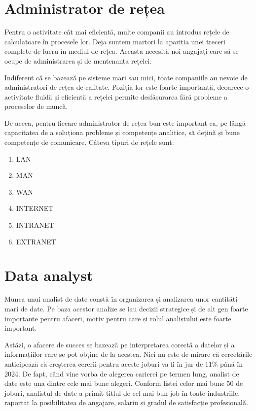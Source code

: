 \documentclass{article}
\begin{document}
\section{Administrator de rețea}
\hspace{0.5 cm}Pentru o activitate cât mai eficientă, multe companii au introdus rețele de calculatoare în procesele lor. Deja suntem martori la apariția unei treceri complete de lucru în mediul de rețea. Aceasta necesită noi angajați care să se ocupe de administrarea și de mentenanța rețelei.\par
Indiferent că se bazează pe sisteme mari sau mici, toate companiile au nevoie de  administratori de rețea de calitate. Poziția lor este foarte importantă, deoarece o activitate fluidă și eficientă a rețelei permite desfășurarea fără probleme a proceselor de muncă.\par
De aceea, pentru fiecare administrator de rețea bun este important ca, pe lângă capacitatea de a soluționa probleme și competențe analitice, să dețină și bune competențe de comunicare. Câteva tipuri de rețele sunt:
\begin{enumerate}
\item LAN
\item MAN
\item WAN
\item INTERNET
\item INTRANET
\item EXTRANET
\end{enumerate} 
\section{Data analyst}
\hspace{0.5 cm}Munca unui analist de date constă în organizarea și analizarea unor cantități mari de date. Pe baza acestor analize se iau decizii strategice și de alt gen foarte importante pentru afaceri, motiv pentru care și rolul analistului este foarte important.\par
Astăzi, o afacere de succes se bazează pe interpretarea corectă a datelor și a informațiilor care se pot obține de la acestea. Nici nu este de mirare că cercetările anticipează că creșterea cererii pentru aceste joburi va fi în jur de 11\% până în 2024. De fapt, când vine vorba de alegerea carierei pe termen lung, analist de date este una dintre cele mai bune alegeri. Conform listei celor mai bune 50 de joburi, analistul de date a primit titlul de cel mai bun job în toate industriile, raportat la posibilitatea de angajare, salariu și gradul de satisfacție profesională.
\end{document}
